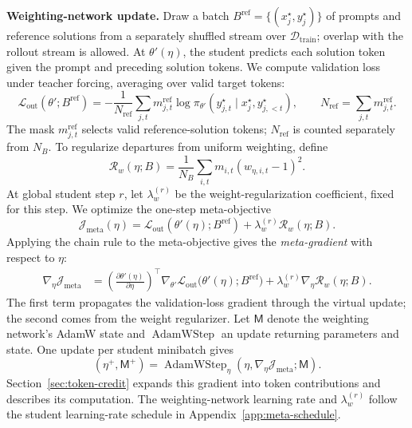 \documentclass{article}
\theoremstyle{plain}
\theoremstyle{definition}
\theoremstyle{remark}
\newcommand{\Dtrain}{\mathcal{D}_{\mathrm{train}}}
\begin{document}
\textbf{Weighting-network update.}
Draw a batch \(B^{\mathrm{ref}}=\{(x_j^\star,y_j^\star)\}\) of prompts and reference solutions from a separately shuffled stream over \(\Dtrain\); overlap with the rollout stream is allowed. At \(\theta'(\eta)\), the student predicts each solution token given the prompt and preceding solution tokens. We compute validation loss under teacher forcing, averaging over valid target tokens:
\begin{equation}
    \mathcal L_{\mathrm{out}}(\theta';B^{\mathrm{ref}})
    =-\frac{1}{N_{\mathrm{ref}}}\sum_{j,t}m^{\mathrm{ref}}_{j,t}
       \log\pi_{\theta'}(y_{j,t}^\star\mid x_j^\star,y_{j,<t}^\star),
    \qquad N_{\mathrm{ref}}=\sum_{j,t}m^{\mathrm{ref}}_{j,t}.
    \label{eq:outer-loss}
\end{equation}
The mask \(m^{\mathrm{ref}}_{j,t}\) selects valid reference-solution tokens; \(N_{\mathrm{ref}}\) is counted separately from \(N_B\).
To regularize departures from uniform weighting, define
\begin{equation}
    \mathcal R_w(\eta;B)=\frac{1}{N_B}\sum_{i,t}
      m_{i,t}(w_{\eta,i,t}-1)^2.
    \label{eq:weight-regularizer}
\end{equation}
At global student step \(r\), let \(\lambda_w^{(r)}\) be the weight-regularization coefficient, fixed for this step. We optimize the one-step meta-objective
\begin{equation}
    \mathcal J_{\mathrm{meta}}(\eta)
    =\mathcal L_{\mathrm{out}}(\theta'(\eta);B^{\mathrm{ref}})
      +\lambda_w^{(r)}\mathcal R_w(\eta;B).
    \label{eq:meta-objective}
\end{equation}
Applying the chain rule to the meta-objective gives the \emph{meta-gradient} with respect to \(\eta\):
\begin{equation}
\begin{aligned}
    \nabla_\eta\mathcal J_{\mathrm{meta}}
    &=\left(\frac{\partial\theta'(\eta)}{\partial\eta}\right)^\top
      \nabla_{\theta'}\mathcal L_{\mathrm{out}}
      \bigl(\theta'(\eta);B^{\mathrm{ref}}\bigr)
      +\lambda_w^{(r)}\nabla_\eta\mathcal R_w(\eta;B).
\end{aligned}
\label{eq:bilevel-meta-gradient}
\end{equation}
The first term propagates the validation-loss gradient through the virtual update; the second comes from the weight regularizer. Let \(\mathsf M\) denote the weighting network's AdamW state and \(\operatorname{AdamWStep}\) an update returning parameters and state. One update per student minibatch gives
\begin{equation}
    (\eta^+,\mathsf M^+)
    =\operatorname{AdamWStep}_{\eta}
      (\eta,\nabla_\eta\mathcal J_{\mathrm{meta}};\mathsf M).
    \label{eq:meta-update}
\end{equation}
Section~\ref{sec:token-credit} expands this gradient into token contributions and describes its computation. The weighting-network learning rate and \(\lambda_w^{(r)}\) follow the student learning-rate schedule in Appendix~\ref{app:meta-schedule}.
\end{document}
